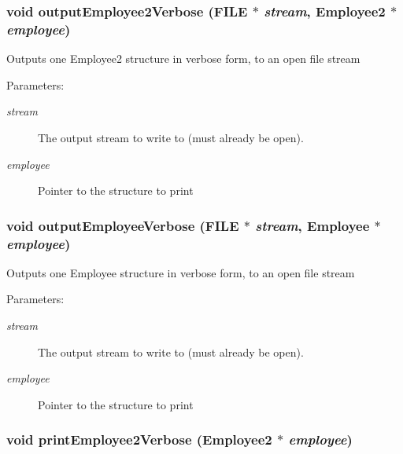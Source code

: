 \subsubsection{\setlength{\rightskip}{0pt plus 5cm}void output\-Employee2Verbose (FILE $\ast$ {\em stream}, \bf{Employee2} $\ast$ {\em employee})}\label{employee_8c_0e904654f127aeefbd9a1b8fa1913d68}


Outputs one Employee2 structure in verbose form, to an open file stream \begin{Desc}
\item[Parameters:]
\begin{description}
\item[{\em stream}]The output stream to write to (must already be open). \item[{\em employee}]Pointer to the structure to print \end{description}
\end{Desc}
\subsubsection{\setlength{\rightskip}{0pt plus 5cm}void output\-Employee\-Verbose (FILE $\ast$ {\em stream}, \bf{Employee} $\ast$ {\em employee})}\label{employee_8c_724c7914065fffbb2da47f446b1227ea}


Outputs one Employee structure in verbose form, to an open file stream \begin{Desc}
\item[Parameters:]
\begin{description}
\item[{\em stream}]The output stream to write to (must already be open). \item[{\em employee}]Pointer to the structure to print \end{description}
\end{Desc}
\subsubsection{\setlength{\rightskip}{0pt plus 5cm}void print\-Employee2Verbose (\bf{Employee2} $\ast$ {\em employee})}\label{employee_8c_ad83702fe144eb7a8c8626da8b0fdea1}


